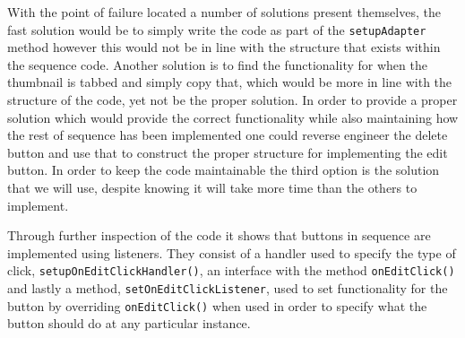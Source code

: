 With the point of failure located a number of solutions present themselves, the fast solution would be to simply write the code as part of the \texttt{setupAdapter} method however this would not be in line with the structure that exists within the sequence code.
Another solution is to find the functionality for when the thumbnail is tabbed and simply copy that, which would be more in line with the structure of the code, yet not be the proper solution.
In order to provide a proper solution which would provide the correct functionality while also maintaining how the rest of sequence has been implemented one could reverse engineer the delete button and use that to construct the proper structure for implementing the edit button.
In order to keep the code maintainable the third option is the solution that we will use, despite knowing it will take more time than the others to implement.

\bigskip 
\noindent
Through further inspection of the code it shows that buttons in sequence are implemented using listeners.
They consist of a handler used to specify the type of click, \texttt{setupOnEditClickHandler()}, an interface with the method \texttt{onEditClick()} and lastly a method, \texttt{setOnEditClickListener}, used to set functionality for the button by overriding \texttt{onEditClick()} when used in order to specify what the button should do at any particular instance.
